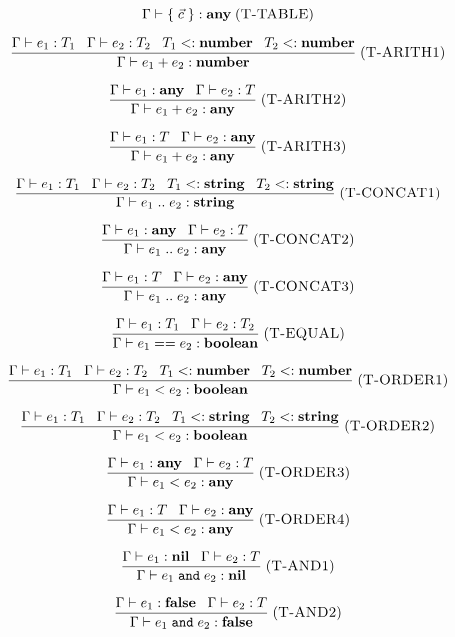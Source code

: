 \documentclass[12pt]{article}
\newcommand{\Any}{\mathbf{any}}
\newcommand{\Nil}{\mathbf{nil}}
\newcommand{\False}{\mathbf{false}}
\newcommand{\Boolean}{\mathbf{boolean}}
\newcommand{\Number}{\mathbf{number}}
\newcommand{\String}{\mathbf{string}}
\newcommand{\kw}[1]{\mathbf{\texttt{#1}}}
\newcommand{\mylabel}[1]{\; (\textsc{#1})}
\newcommand{\subtype}{<:}
\newcommand{\env}{\Gamma}
\begin{document}
\[
\env \vdash \{ \; \vec{c} \; \} : \Any
\mylabel{T-TABLE}
\]

\[
\frac{\env \vdash e_{1}:T_{1} \;\;\;
      \env \vdash e_{2}:T_{2} \;\;\;
      T_{1} \subtype \Number \;\;\;
      T_{2} \subtype \Number}
     {\env \vdash e_{1} + e_{2} : \Number}
\mylabel{T-ARITH1}
\]

\[
\frac{\env \vdash e_{1}:\Any \;\;\;
      \env \vdash e_{2}:T}
     {\env \vdash e_{1} + e_{2} : \Any}
\mylabel{T-ARITH2}
\]

\[
\frac{\env \vdash e_{1}:T \;\;\;
      \env \vdash e_{2}:\Any}
     {\env \vdash e_{1} + e_{2} : \Any}
\mylabel{T-ARITH3}
\]

\[
\frac{\env \vdash e_{1}:T_{1} \;\;\;
      \env \vdash e_{2}:T_{2} \;\;\;
      T_{1} \subtype \String \;\;\;
      T_{2} \subtype \String}
     {\env \vdash e_{1} \; {..} \; e_{2} : \String}
\mylabel{T-CONCAT1}
\]

\[
\frac{\env \vdash e_{1}:\Any \;\;\;
      \env \vdash e_{2}:T}
     {\env \vdash e_{1} \; {..} \; e_{2} : \Any}
\mylabel{T-CONCAT2}
\]

\[
\frac{\env \vdash e_{1}:T \;\;\;
      \env \vdash e_{2}:\Any}
     {\env \vdash e_{1} \; {..} \; e_{2} : \Any}
\mylabel{T-CONCAT3}
\]

\[
\frac{\env \vdash e_{1}:T_{1} \;\;\;
      \env \vdash e_{2}:T_{2}}
     {\env \vdash e_{1} == e_{2} : \Boolean}
\mylabel{T-EQUAL}
\]

\[
\frac{\env \vdash e_{1}:T_{1} \;\;\;
      \env \vdash e_{2}:T_{2} \;\;\;
      T_{1} \subtype \Number \;\;\;
      T_{2} \subtype \Number}
     {\env \vdash e_{1} < e_{2} : \Boolean}
\mylabel{T-ORDER1}
\]

\[
\frac{\env \vdash e_{1}:T_{1} \;\;\;
      \env \vdash e_{2}:T_{2} \;\;\;
      T_{1} \subtype \String \;\;\;
      T_{2} \subtype \String}
     {\env \vdash e_{1} < e_{2} : \Boolean}
\mylabel{T-ORDER2}
\]

\[
\frac{\env \vdash e_{1}:\Any \;\;\;
      \env \vdash e_{2}:T}
     {\env \vdash e_{1} < e_{2} : \Any}
\mylabel{T-ORDER3}
\]

\[
\frac{\env \vdash e_{1}:T \;\;\;
      \env \vdash e_{2}:\Any}
     {\env \vdash e_{1} < e_{2} : \Any}
\mylabel{T-ORDER4}
\]

\[
\frac{\env \vdash e_{1}:\Nil \;\;\;
      \env \vdash e_{2}:T}
     {\env \vdash e_{1} \; \kw{and} \; e_{2} : \Nil}
\mylabel{T-AND1}
\]

\[
\frac{\env \vdash e_{1}:\False \;\;\;
      \env \vdash e_{2}:T}
     {\env \vdash e_{1} \; \kw{and} \; e_{2} : \False}
\mylabel{T-AND2}
\]
\end{document}
